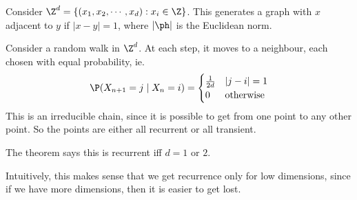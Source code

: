 \documentclass[a4paper]{article}
\begin{document}
\begin{thm}
  Consider $\Z^d = \{(x_1, x_2, \cdots, x_d): x_i \in \Z\}$. This generates a graph with $x$ adjacent to $y$ if $|x - y| = 1$, where $|\ph |$ is the Euclidean norm.
  \begin{center}
  \end{center}
  Consider a random walk in $\Z^d$. At each step, it moves to a neighbour, each chosen with equal probability, ie.
   \[
    \P(X_{n + 1} = j\mid X_n = i) =
    \begin{cases}
      \frac{1}{2d} & |j - i| = 1\\
      0 & \text{otherwise}
    \end{cases}
  \]
  This is an irreducible chain, since it is possible to get from one point to any other point. So the points are either all recurrent or all transient.

  The theorem says this is recurrent iff $d = 1$ or $2$.
\end{thm}
Intuitively, this makes sense that we get recurrence only for low dimensions, since if we have more dimensions, then it is easier to get lost.
\end{document}
